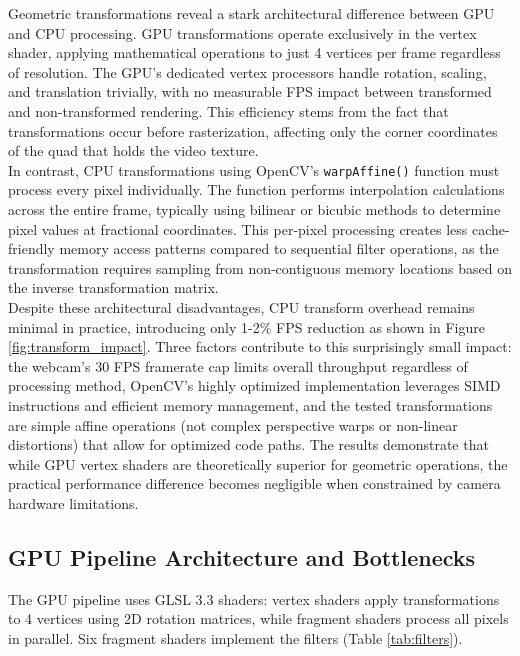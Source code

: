 \documentclass[12pt,a4paper]{article}
\begin{document}
Geometric transformations reveal a stark architectural difference between GPU and CPU processing. GPU transformations operate exclusively in the vertex shader, applying mathematical operations to just 4 vertices per frame regardless of resolution. The GPU's dedicated vertex processors handle rotation, scaling, and translation trivially, with no measurable FPS impact between transformed and non-transformed rendering. This efficiency stems from the fact that transformations occur before rasterization, affecting only the corner coordinates of the quad that holds the video texture.
\\
In contrast, CPU transformations using OpenCV's \texttt{warpAffine()} function must process every pixel individually. The function performs interpolation calculations across the entire frame, typically using bilinear or bicubic methods to determine pixel values at fractional coordinates. This per-pixel processing creates less cache-friendly memory access patterns compared to sequential filter operations, as the transformation requires sampling from non-contiguous memory locations based on the inverse transformation matrix.
\\
Despite these architectural disadvantages, CPU transform overhead remains minimal in practice, introducing only 1-2\% FPS reduction as shown in Figure \ref{fig:transform_impact}. Three factors contribute to this surprisingly small impact: the webcam's 30 FPS framerate cap limits overall throughput regardless of processing method, OpenCV's highly optimized implementation leverages SIMD instructions and efficient memory management, and the tested transformations are simple affine operations (not complex perspective warps or non-linear distortions) that allow for optimized code paths. The results demonstrate that while GPU vertex shaders are theoretically superior for geometric operations, the practical performance difference becomes negligible when constrained by camera hardware limitations.

\subsection{GPU Pipeline Architecture and Bottlenecks}

The GPU pipeline uses GLSL 3.3 shaders: vertex shaders apply transformations to 4 vertices using 2D rotation matrices, while fragment shaders process all pixels in parallel. Six fragment shaders implement the filters (Table \ref{tab:filters}).
\end{document}
